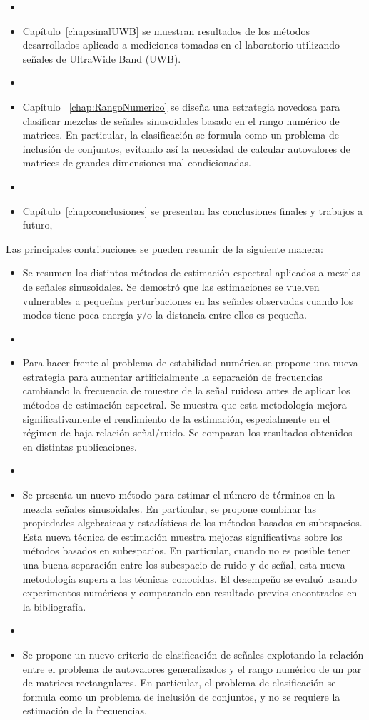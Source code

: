 \begin{itemize}
	\item[] 
	\item Capítulo~\ref{chap:sinalUWB} se muestran resultados de los métodos desarrollados aplicado a mediciones tomadas en el laboratorio utilizando señales de UltraWide Band (UWB).
	\item[] 
	\item Capítulo ~\ref{chap:RangoNumerico} se diseña una estrategia novedosa para clasificar mezclas de señales sinusoidales basado en el rango numérico de matrices. En particular, la clasificación se formula como un problema de inclusión de conjuntos, evitando así la necesidad de calcular autovalores de matrices de grandes dimensiones mal condicionadas.
	\item[]
	\item Capítulo~\ref{chap:conclusiones} se presentan las conclusiones finales y trabajos a futuro, 
\end{itemize}

Las principales contribuciones se pueden resumir de la siguiente manera:
\begin{itemize}
	\item Se resumen los distintos métodos de estimación espectral aplicados a mezclas de señales sinusoidales. Se demostró que las estimaciones se vuelven vulnerables a pequeñas perturbaciones en las señales observadas cuando los modos tiene poca energía y/o la distancia entre ellos es pequeña.
	\item[] 
	\item Para hacer frente al problema de estabilidad numérica se propone una nueva estrategia para aumentar artificialmente la separación de frecuencias cambiando la frecuencia de muestre de la señal ruidosa antes de aplicar los métodos de estimación espectral. Se muestra que esta metodología mejora significativamente el rendimiento de la estimación, especialmente en el régimen de baja relación señal/ruido. Se comparan los resultados obtenidos en distintas publicaciones.
	\item[] 
	\item Se presenta un nuevo método para estimar el número de términos en la mezcla señales sinusoidales. En particular, se propone combinar las propiedades algebraicas y estadísticas de los métodos basados en subespacios. Esta nueva técnica de estimación  muestra mejoras significativas sobre los métodos basados en subespacios. En particular, cuando no es posible tener una buena separación entre los subespacio de ruido y de señal, esta nueva metodología supera a las técnicas conocidas. El desempeño se evaluó usando experimentos numéricos y comparando con resultado previos encontrados en la bibliografía.
	\item[]
	\item Se propone un nuevo criterio de clasificación de señales explotando la relación entre el problema de autovalores generalizados y el rango numérico de un par de matrices rectangulares. En particular, el problema de clasificación se formula como un problema de inclusión de conjuntos, y no se requiere la estimación de la frecuencias.
\end{itemize}


